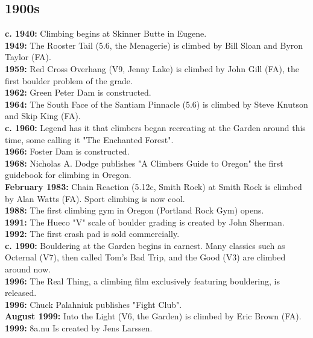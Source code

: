 \subsection*{1900s}
\colorbox{green!20}{\textbf{c. 1940:}} Climbing begins at Skinner Butte in Eugene.\\
\colorbox{green!20}{\textbf{1949:}} The Rooster Tail (5.6, the Menagerie) is climbed by Bill Sloan and Byron Taylor (FA).\\
\colorbox{red!20}{\textbf{1959:}} Red Cross Overhang (V9, Jenny Lake) is climbed by John Gill (FA), the first boulder problem of the grade.\\
\colorbox{Goldenrod!50}{\textbf{1962:}} Green Peter Dam is constructed.\\
\colorbox{green!20}{\textbf{1964:}} The South Face of the Santiam Pinnacle (5.6) is climbed by Steve Knutson and Skip King (FA).\\
\colorbox{green!20}{\textbf{c. 1960:}} Legend has it that climbers began recreating at the Garden around this time, some calling it "The Enchanted Forest".\\
\colorbox{Goldenrod!50}{\textbf{1966:}} Foster Dam is constructed.\\
\colorbox{green!20}{\textbf{1968:}} Nicholas A. Dodge publishes "A Climbers Guide to Oregon" the first guidebook for climbing in Oregon.\\
\colorbox{green!20}{\textbf{February 1983:}} Chain Reaction (5.12c, Smith Rock) at Smith Rock is climbed by Alan Watts (FA). Sport climbing is now cool.\\
\colorbox{green!20}{\textbf{1988:}} The first climbing gym in Oregon (Portland Rock Gym) opens.\\
\colorbox{red!20}{\textbf{1991:}} The Hueco "V" scale of boulder grading is created by John Sherman.\\
\colorbox{red!20}{\textbf{1992:}} The first crash pad is sold commercially.\\
\colorbox{green!20}{\textbf{c. 1990:}} Bouldering at the Garden begins in earnest. Many classics such as Octernal (V7), then called Tom's Bad Trip, and the Good (V3) are climbed around now.\\
\colorbox{red!20}{\textbf{1996:}} The Real Thing, a climbing film exclusively featuring bouldering, is released.\\
\colorbox{red!20}{\textbf{1996:}} Chuck Palahniuk publishes "Fight Club".\\
\colorbox{green!20}{\textbf{August 1999:}} Into the Light (V6, the Garden) is climbed by Eric Brown (FA).\\
\colorbox{red!20}{\textbf{1999:}} 8a.nu Is created by Jens Larssen.\\
